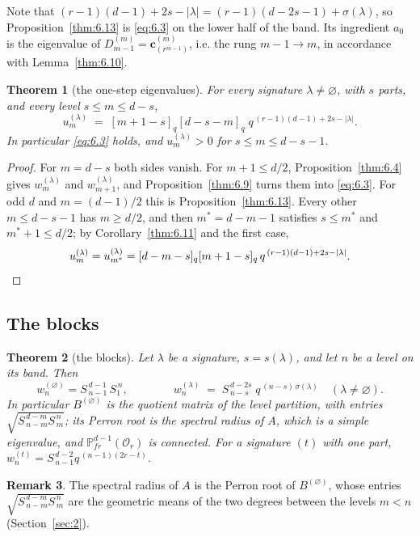 \documentclass[11pt]{article}
\numberwithin{equation}{section}
\theoremstyle{plain}
\newtheorem{theorem}{Theorem}[section]
\theoremstyle{definition}
\newtheorem{remark}[theorem]{Remark}
\begin{document}
Note that $(r-1)(d-1)+2s-|\lambda|=(r-1)(d-2s-1)+\sigma(\lambda)$, so
Proposition~\ref{thm:6.13} is \eqref{eq:6.3} on the lower half of the band. Its ingredient
$a_0$ is the eigenvalue of $D^{(m)}_{m-1}=\mathbf c^{(m)}_{(r^{m-1})}$, i.e. the rung
$m-1\to m$, in accordance with Lemma~\ref{thm:6.10}.

\begin{theorem}[the one-step eigenvalues]\label{thm:6.14}
For every signature $\lambda\ne\varnothing$, with $s$ parts, and every level $s\le m\le d-s$,
\[
u^{(\lambda)}_m\;=\;[m+1-s]_q[d-s-m]_q\;q^{\,(r-1)(d-1)+2s-|\lambda|}.
\]
In particular \eqref{eq:6.3} holds, and $u^{(\lambda)}_m>0$ for $s\le m\le d-s-1$.
\end{theorem}

\begin{proof}
For $m=d-s$ both sides vanish. For $m+1\le d/2$, Proposition~\ref{thm:6.4} gives
$w^{(\lambda)}_m$ and $w^{(\lambda)}_{m+1}$, and Proposition~\ref{thm:6.9} turns them into
\eqref{eq:6.3}. For odd $d$ and $m=(d-1)/2$ this is Proposition~\ref{thm:6.13}. Every
other $m\le d-s-1$ has $m\ge d/2$, and then $m^*=d-m-1$ satisfies $s\le m^*$ and
$m^*+1\le d/2$; by Corollary~\ref{thm:6.11} and the first case,
\[
u^{(\lambda)}_m=u^{(\lambda)}_{m^*}
=[d-m-s]_q[m+1-s]_q\,q^{\,(r-1)(d-1)+2s-|\lambda|} . \qedhere
\]
\end{proof}

\subsection{The blocks}\label{sec:6.4}

\begin{theorem}[the blocks]\label{thm:6.15}
Let $\lambda$ be a signature, $s=s(\lambda)$, and let $n$
be a level on its band. Then
\[
w^{(\varnothing)}_n=S^{\,d-1}_{\,n-1}\,S^{\,n}_{1},
\qquad\qquad
w^{(\lambda)}_n\;=\;S^{\,d-2s}_{\,n-s}\;q^{\,(n-s)\,\sigma(\lambda)}\quad(\lambda\ne\varnothing).
\]
In particular $B^{(\varnothing)}$ is the quotient matrix of the level partition, with
entries $\sqrt{S^{\,d-m}_{\,n-m}S^{\,n}_{\,m}}$; its Perron root is the spectral
radius of $A$, which is a simple eigenvalue, and $\mathbb{P}^{d-1}_{fr}(\mathcal{O}_r)$ is connected.
For a signature $(t)$ with one part, $w^{(t)}_n=S^{\,d-2}_{\,n-1}q^{\,(n-1)(2r-t)}$.
\end{theorem}

\begin{remark}\label{thm:6.16}
The spectral radius of $A$ is the Perron root of $B^{(\varnothing)}$,
whose entries $\sqrt{S^{\,d-m}_{\,n-m}S^{\,n}_{\,m}}$ are the geometric means of the
two degrees between the levels $m<n$ (Section~\ref{sec:2}).
\end{remark}
\end{document}
